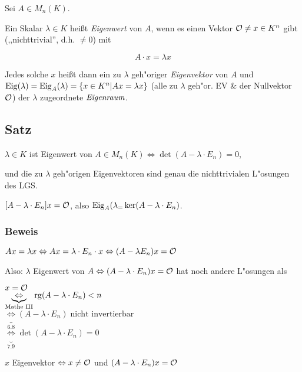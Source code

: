 Sei $A \in M_n(K)$.

Ein Skalar $\lambda \in K$ heißt \emph{Eigenwert} von $A$, wenn es einen Vektor $\mathcal{O} \neq x \in K^n$ gibt (,,nichttrivial'', d.h. $\neq 0$) mit

\[A\cdot x = \lambda x\]

Jedes solche $x$ heißt dann ein zu $\lambda$ geh"origer \emph{Eigenvektor} von $A$ und $\mathrm{ Eig }(\lambda)=\mathrm{ Eig }_A(\lambda)=\{x \in K^n | Ax=\lambda x \}$ (alle zu $\lambda$ geh"or. EV \& der Nullvektor $\mathcal{O}$) der $\lambda$ zugeordnete $\emph{Eigenraum}$.

\subsection{Satz}

$\lambda \in K$ ist Eigenwert von $A \in M_n(K) \Leftrightarrow \det(A-\lambda \cdot E_n) = 0$,

und die zu $\lambda$ geh"origen Eigenvektoren sind genau die nichttrivialen L"osungen des LGS.

$[A - \lambda \cdot E_n] x = \mathcal{O}$, also $\mathrm{ Eig }_A(\lambda_ = \ker(A- \lambda \cdot E_n)$.

\subsubsection*{Beweis}

$Ax = \lambda x \Leftrightarrow Ax = \lambda \cdot E_n \cdot x \Leftrightarrow (A - \lambda E_n) x = \mathcal{O}$

Also: $\lambda$ Eigenwert von $A \Leftrightarrow (A- \lambda \cdot E_n)x = \mathcal{O}$ hat noch andere L"osungen als 

$x = \mathcal{O}$\\
$\underbrace{\Leftrightarrow}_{\text{Mathe III}} \mathrm{ rg }(A-\lambda \cdot E_n) < n$\\
$\underbrace{\Leftrightarrow}_{6.8}(A-\lambda \cdot E_n) \; \text{nicht invertierbar}$\\
$\underbrace{\Leftrightarrow}_{7.9}\det(A-\lambda \cdot E_n) = 0$

$x$ Eigenvektor $\Leftrightarrow x \neq \mathcal{O}$ und $(A- \lambda \cdot E_n) x = \mathcal{O}$


